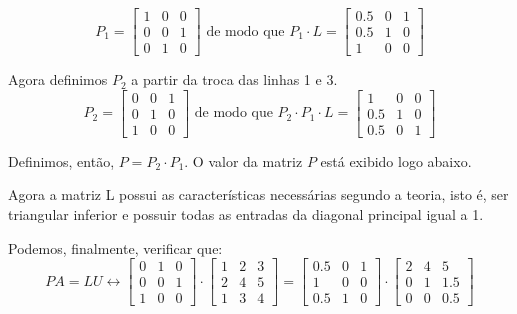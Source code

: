 \documentclass[12pt]{article}
\begin{document}
\begin{equation*}
	P_1=
	\begin{bmatrix}
		1 & 0 & 0\\
		0 & 0 & 1\\
		0 & 1 & 0
	\end{bmatrix} \mbox{ de modo que }
	P_1\cdot L=
	\begin{bmatrix}
		0.5 & 0 & 1\\
		0.5 & 1 & 0\\
		1 & 0 & 0
	\end{bmatrix}
\end{equation*}

Agora definimos $P_2$ a partir da troca das linhas 1 e 3.
\begin{equation*}
	P_2=
	\begin{bmatrix}
		0 & 0 & 1\\
		0 & 1 & 0\\
		1 & 0 & 0
	\end{bmatrix} \mbox{ de modo que }
	P_2\cdot P_1\cdot L=
	\begin{bmatrix}
		1 & 0 & 0\\
		0.5 & 1 & 0\\
		0.5 & 0 & 1
	\end{bmatrix}
\end{equation*}

Definimos, então, $P=P_2\cdot P_1$. O valor da matriz $P$ está exibido logo abaixo.

Agora a matriz L possui as características necessárias segundo a teoria, isto é, ser triangular inferior e possuir todas as entradas da diagonal principal igual a 1.

Podemos, finalmente, verificar que:
\begin{equation*}
	PA=LU \leftrightarrow 
	\begin{bmatrix}
		0 & 1 & 0\\
		0 & 0 & 1\\
		1 & 0 & 0
	\end{bmatrix}
	\cdot  
	\begin{bmatrix}
		1 & 2 & 3\\
		2 & 4 & 5\\
		1 & 3 & 4
	\end{bmatrix}=
	\begin{bmatrix}
		0.5 & 0 & 1\\
		1 & 0 & 0\\
		0.5 & 1 & 0
	\end{bmatrix} \cdot
	\begin{bmatrix}
		2 & 4 & 5\\
		0 & 1 & 1.5\\
		0 & 0 & 0.5
	\end{bmatrix}
\end{equation*}
\end{document}
